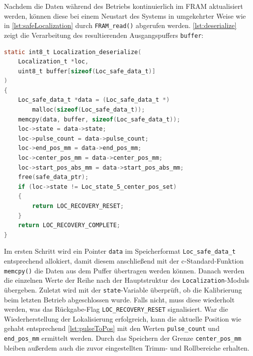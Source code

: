 \noindent
Nachdem die Daten während des Betriebs kontinuierlich im FRAM aktualisiert werden, können diese bei einem Neustart des Systems in umgekehrter Weise wie in \autoref{lst:safeLocalization} durch \verb|FRAM_read()| abgerufen werden. \autoref{lst:deserialize} zeigt die Verarbeitung des resultierenden Ausgangspuffers \verb|buffer|:
\begin{lstlisting}[language=C, caption={Auslesen der Positionsdaten aus dem FRAM-Puffer}, label={lst:deserialize}]
static int8_t Localization_deserialize(
	Localization_t *loc, 
	uint8_t buffer[sizeof(Loc_safe_data_t)]
)
{
	Loc_safe_data_t *data = (Loc_safe_data_t *)
		malloc(sizeof(Loc_safe_data_t));
	memcpy(data, buffer, sizeof(Loc_safe_data_t));
	loc->state = data->state;
	loc->pulse_count = data->pulse_count;
	loc->end_pos_mm = data->end_pos_mm;
	loc->center_pos_mm = data->center_pos_mm;
	loc->start_pos_abs_mm = data->start_pos_abs_mm;
	free(safe_data_ptr);
	if (loc->state != Loc_state_5_center_pos_set)
	{
		return LOC_RECOVERY_RESET;
	}
	return LOC_RECOVERY_COMPLETE;
}
\end{lstlisting}
Im ersten Schritt wird ein Pointer \verb|data| im Speicherformat \verb|Loc_safe_data_t| entsprechend allokiert, damit diesem anschließend mit der c-Standard-Funktion \verb|memcpy()| die Daten aus dem Puffer übertragen werden können. Danach werden die einzelnen Werte der Reihe nach der Hauptstruktur des \verb|Localization|-Moduls übergeben. Zuletzt wird mit der \verb|state|-Variable überprüft, ob die Kalibrierung beim letzten Betrieb abgeschlossen wurde. Falls nicht, muss diese wiederholt werden, was das Rückgabe-Flag \verb|LOC_RECOVERY_RESET| signalisiert. War die Wiederherstellung der Lokalisierung erfolgreich, kann die aktuelle Position wie gehabt entsprechend \autoref{lst:pulseToPos} mit den Werten \verb|pulse_count| und \verb|end_pos_mm| ermittelt werden. Durch das Speichern der Grenze \verb|center_pos_mm| bleiben außerdem auch die zuvor eingestellten Trimm- und Rollbereiche erhalten.

